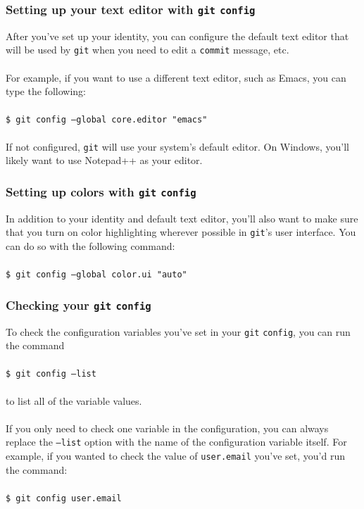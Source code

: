 \documentclass{beamer}
\begin{document}
\begin{frame}
   \frametitle{Setting up your text editor with \texttt{git} \texttt{config}}
   After you've set up your identity, you can configure the default text 
   editor that will be used by \texttt{git} when you need to edit a 
   \texttt{commit} message, etc.
   \\ \ \\
   For example, if you want to use a different text editor, such as 
   Emacs, you can type the following:
   \\ \ \\
   \texttt{\hspace{1.0em}\$ git config --global core.editor "emacs"}
   \\ \ \\
   If not configured, \texttt{git} will use your system's default editor.
   On Windows, you'll likely want to use Notepad++ as your editor.
\end{frame}

\begin{frame}
   \frametitle{Setting up colors with \texttt{git} \texttt{config}}
   In addition to your identity and default text editor, you'll also 
   want to make sure that you turn on color highlighting wherever 
   possible in \texttt{git}'s user interface. You can do so with the 
   following command:
   \\ \ \\
   \texttt{\hspace{1.0em}\$ git config --global color.ui "auto"}
\end{frame}

\begin{frame}
   \frametitle{Checking your \texttt{git} \texttt{config}}
   To check the configuration variables you've set in your 
   \texttt{git} \texttt{config}, you can run the command
   \\ \ \\
   \texttt{\hspace{1.0em}\$ git config --list}
   \\ \ \\
   to list all of the variable values. 
   \\ \ \\
   If you only need to check one variable in the configuration, you can
   always replace the \texttt{--list} option with the name of the 
   configuration variable itself. For example, if you wanted to check 
   the value of \texttt{user.email} you've set, you'd run the command:
   \\ \ \\
   \texttt{\hspace{1.0em}\$ git config user.email}
\end{frame}
\end{document}
